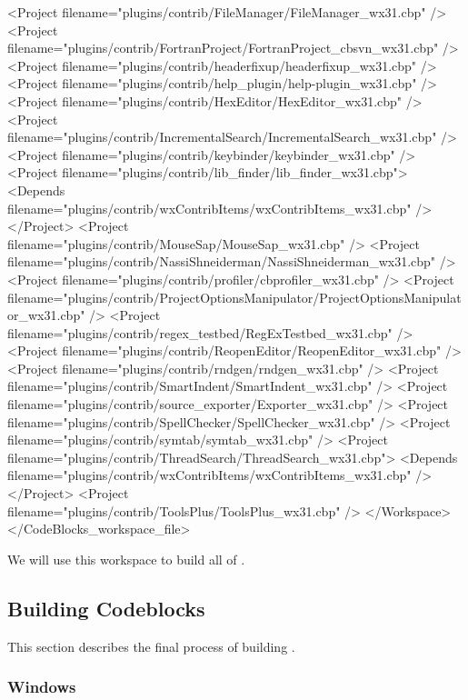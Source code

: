\begin{code}
    <Project filename="plugins/contrib/FileManager/FileManager_wx31.cbp" />
    <Project filename="plugins/contrib/FortranProject/FortranProject_cbsvn_wx31.cbp" />
    <Project filename="plugins/contrib/headerfixup/headerfixup_wx31.cbp" />
    <Project filename="plugins/contrib/help_plugin/help-plugin_wx31.cbp" />
    <Project filename="plugins/contrib/HexEditor/HexEditor_wx31.cbp" />
    <Project filename="plugins/contrib/IncrementalSearch/IncrementalSearch_wx31.cbp" />
    <Project filename="plugins/contrib/keybinder/keybinder_wx31.cbp" />
    <Project filename="plugins/contrib/lib_finder/lib_finder_wx31.cbp">
      <Depends filename="plugins/contrib/wxContribItems/wxContribItems_wx31.cbp" />
    </Project>
    <Project filename="plugins/contrib/MouseSap/MouseSap_wx31.cbp" />
    <Project filename="plugins/contrib/NassiShneiderman/NassiShneiderman_wx31.cbp" />
    <Project filename="plugins/contrib/profiler/cbprofiler_wx31.cbp" />
    <Project filename="plugins/contrib/ProjectOptionsManipulator/ProjectOptionsManipulator_wx31.cbp" />
    <Project filename="plugins/contrib/regex_testbed/RegExTestbed_wx31.cbp" />
    <Project filename="plugins/contrib/ReopenEditor/ReopenEditor_wx31.cbp" />
    <Project filename="plugins/contrib/rndgen/rndgen_wx31.cbp" />
    <Project filename="plugins/contrib/SmartIndent/SmartIndent_wx31.cbp" />
    <Project filename="plugins/contrib/source_exporter/Exporter_wx31.cbp" />
    <Project filename="plugins/contrib/SpellChecker/SpellChecker_wx31.cbp" />
    <Project filename="plugins/contrib/symtab/symtab_wx31.cbp" />
    <Project filename="plugins/contrib/ThreadSearch/ThreadSearch_wx31.cbp">
      <Depends filename="plugins/contrib/wxContribItems/wxContribItems_wx31.cbp" />
    </Project>
    <Project filename="plugins/contrib/ToolsPlus/ToolsPlus_wx31.cbp" />
  </Workspace>
</CodeBlocks_workspace_file>
\end{code}


We will use this workspace to build all of \codeblocks. 


\subsection{Building Codeblocks}

This section describes the final process of building \codeblocks.

\subsubsection{Windows}

